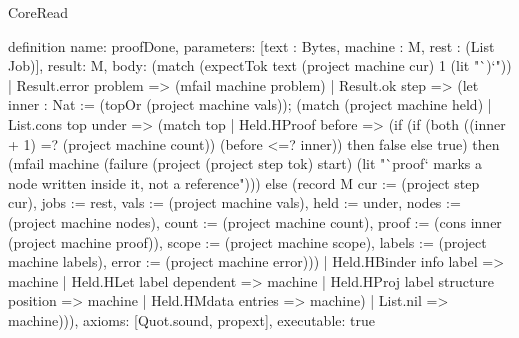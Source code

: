 \begin{lexlean}{CoreRead}
\begin{semanticmodule}
definition{
  name: proofDone,
  parameters: [text : Bytes, machine : M, rest : (List Job)],
  result: M,
  body: (match (expectTok text (project machine cur) 1 (lit "`)`"))
    | Result.error problem => (mfail machine problem)
    | Result.ok step => (let inner : Nat := (topOr (project machine vals)); (match (project machine held)
      | List.cons top under => (match top
        | Held.HProof before => (if (if (both ((inner + 1) =? (project machine count)) (before <=? inner)) then false else true) then (mfail machine (failure (project (project step tok) start) (lit "`proof` marks a node written inside it, not a reference"))) else (record M {cur := (project step cur), jobs := rest, vals := (project machine vals), held := under, nodes := (project machine nodes), count := (project machine count), proof := (cons inner (project machine proof)), scope := (project machine scope), labels := (project machine labels), error := (project machine error)}))
        | Held.HBinder info label => machine
        | Held.HLet label dependent => machine
        | Held.HProj label structure position => machine
        | Held.HMdata entries => machine)
      | List.nil => machine))),
  axioms: [Quot.sound, propext],
  executable: true
}


\end{semanticmodule}
\end{lexlean}

